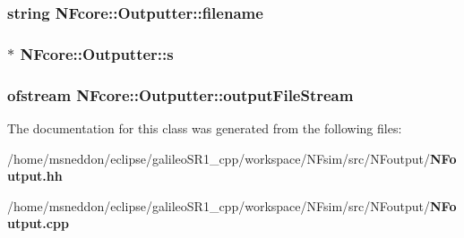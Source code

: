 \subsubsection{\setlength{\rightskip}{0pt plus 5cm}string {\bf NFcore::Outputter::filename}\hspace{0.3cm}{\tt  [protected]}}\label{classNFcore_1_1Outputter_150c6ee5c2eb1f61eaef24139c05e4ed}


\subsubsection{$\ast$ {\bf NFcore::Outputter::s}\hspace{0.3cm}{\tt  [protected]}}\label{classNFcore_1_1Outputter_c63f98e10701598bf2dc79b0c76d2447}


\subsubsection{\setlength{\rightskip}{0pt plus 5cm}ofstream {\bf NFcore::Outputter::outputFileStream}\hspace{0.3cm}{\tt  [protected]}}\label{classNFcore_1_1Outputter_01b52e6b6164df23aac52809fb4d6ae6}




The documentation for this class was generated from the following files:\begin{CompactItemize}
\item 
/home/msneddon/eclipse/galileoSR1\_\-cpp/workspace/NFsim/src/NFoutput/{\bf NFoutput.hh}\item 
/home/msneddon/eclipse/galileoSR1\_\-cpp/workspace/NFsim/src/NFoutput/{\bf NFoutput.cpp}\end{CompactItemize}
